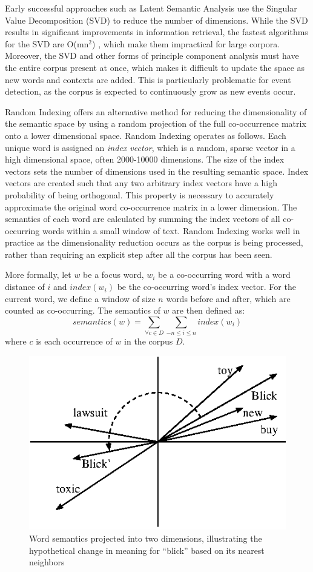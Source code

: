 \documentclass[a4paper,twocolumn,twoside,10pt]{ranlp}
\begin{document}
Early successful approaches such as Latent Semantic
Analysis\cite{landauer97solution} use the Singular Value Decomposition (SVD) to
reduce the number of dimensions.  While the SVD results in significant
improvements in information retrieval, the fastest algorithms for the SVD are
O(mn$^2$) \cite{bau97numlinalg}, which make them impractical for large corpora.
Moreover, the SVD and other forms of principle component analysis must have the
entire corpus present at once, which makes it difficult to update the space as
new words and contexts are added.  This is particularly problematic for event
detection, as the corpus is expected to continuously grow as new events occur.

Random Indexing\cite{kanerva00random,sahlgren01vector} offers an alternative
method for reducing the dimensionality of the semantic space by using a random
projection of the full co-occurrence matrix onto a lower dimensional space.
Random Indexing operates as follows.  Each unique word is assigned an
\emph{index vector}, which is a random, sparse vector in a high dimensional
space, often 2000-10000 dimensions. The size of the index vectors sets the
number of dimensions used in the resulting semantic space.  Index vectors are
created such that any two arbitrary index vectors have a high probability of
being orthogonal.  This property is necessary to accurately approximate the
original word co-occurrence matrix in a lower dimension.  The semantics of each
word are calculated by summing the index vectors of all co-occurring words
within a small window of text.  Random Indexing works well in practice as the
dimensionality reduction occurs as the corpus is being processed, rather than
requiring an explicit step after all the corpus has been seen.

More formally, let $w$ be a focus word, $w_i$ be a co-occurring word with a word
distance of $i$ and $index(w_i)$ be the co-occurring word's index vector.  For
the current word, we define a window of size $n$ words before and after, which
are counted as co-occurring.  The semantics of $w$ are then defined as:
%
\begin{equation}
\label{eq:random_indexing}
semantics(w) = \sum_{\forall c \in D} \sum_{ -n \leq i \leq n} index(w_i)
\end{equation}
%
where $c$ is each occurrence of $w$ in the corpus $D$.


\begin{figure} 
  \center
  \includegraphics[width=.35\textwidth]{figures/example-semantic-space.eps} 
  \caption{Word semantics projected into two dimensions, illustrating the
    hypothetical change in meaning for ``blick'' based on its nearest neighbors}
  \label{fig:ri-space} 
\end{figure}
\end{document}
